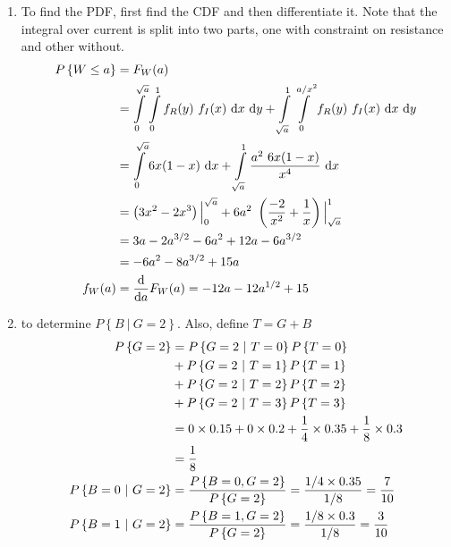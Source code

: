 \begin{enumerate}
	\item To find the PDF, first find the CDF and then differentiate it. Note that the integral over current is split into two parts, one with constraint on resistance and other without. \\
	\begin{subequations}
		\begin{align}
			P \left\{ W \leq a \right\} &= F_W (a) \nonumber \\
			&= \int\limits_{0}^{\sqrt{a}} \int\limits_{0}^{1}  f_R (y) \ f_I(x) \ \mathrm{d}x \ \mathrm{d}y  + \int\limits_{\sqrt{a}}^{1} \int\limits_{0}^{a/x^2}  f_R (y) \ f_I(x) \ \mathrm{d}x \ \mathrm{d}y \nonumber \\
			&= \int\limits_{0}^{\sqrt{a}}  6x(1-x) \ \mathrm{d}x + \int\limits_{\sqrt{a}}^{1} \frac{a^2\ 6x(1-x)}{x^4} \ \mathrm{d}x \nonumber \\
			&= \left(3x^2 - 2x^3\right) \Big|_0^{\sqrt{a}} + 6a^2\ \left(\frac{-2}{x^2} + \frac{1}{x}\right)\Big|_{\sqrt{a}}^{1} \nonumber \\
			&= 3a - 2a^{3/2} - 6a^2 + 12a -6a^{3/2} \nonumber \\
			&= - 6a^2 - 8a^{3/2} + 15a \\
			f_W (a) &= \frac{\mathrm{d}}{\mathrm{d} a} F_W (a) = -12a - 12a^{1/2} + 15
		\end{align} \\
	\end{subequations}
	
	\item to determine $ P \left\{B\ |\ G = 2\right\} $. Also, define $ T = G+B $ \\
	\begin{subequations}
		\begin{align}
			P \left\{G = 2\right\} &= P \left\{G = 2\ |\ T = 0\right\}P \left\{T = 0\right\} \nonumber \\
			&+ P \left\{G = 2\ |\ T = 1\right\}P \left\{T = 1\right\} \nonumber \\ 
			&+ P \left\{G = 2\ |\ T = 2\right\}P \left\{T = 2\right\} \nonumber \\
			&+ P \left\{G = 2\ |\ T = 3\right\}P \left\{T = 3\right\} \nonumber \\
			&= 0 \times 0.15 + 0 \times 0.2 + \frac{1}{4} \times 0.35 + \frac{1}{8} \times 0.3 \nonumber \\
			&= \frac{1}{8} \\
			P \left\{B = 0\ |\ G = 2\right\} &= \frac{P \left\{B = 0, G = 2\right\}}{P \left\{G = 2\right\}} = \frac{1/4 \times 0.35}{1/8} = \frac{7}{10} \\
			P \left\{B = 1\ |\ G = 2\right\} &= \frac{P \left\{B = 1, G = 2\right\}}{P \left\{G = 2\right\}} = \frac{1/8 \times 0.3}{1/8} = \frac{3}{10}
		\end{align} \\
	\end{subequations}
	

\end{enumerate}
